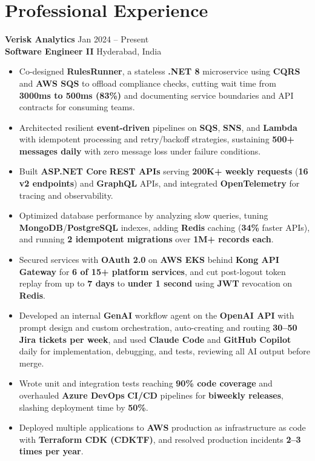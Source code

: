 \documentclass[a4paper,10pt]{article}
\begin{document}
\section*{Professional Experience}

\textbf{Verisk Analytics} \hfill Jan 2024 -- Present \\
\textbf{Software Engineer II} \hfill Hyderabad, India

\begin{itemize}[leftmargin=*]
    \item Co-designed \textbf{RulesRunner}, a stateless \textbf{.NET 8} microservice using \textbf{CQRS} and \textbf{AWS SQS} to offload compliance checks, cutting wait time from \textbf{3000ms to 500ms (83\%)} and documenting service boundaries and API contracts for consuming teams.
    \item Architected resilient \textbf{event-driven} pipelines on \textbf{SQS}, \textbf{SNS}, and \textbf{Lambda} with idempotent processing and retry/backoff strategies, sustaining \textbf{500+ messages daily} with zero message loss under failure conditions.
    \item Built \textbf{ASP.NET Core} \textbf{REST APIs} serving \textbf{200K+ weekly requests} (\textbf{16 v2 endpoints}) and \textbf{GraphQL} APIs, and integrated \textbf{OpenTelemetry} for tracing and observability.
    \item Optimized database performance by analyzing slow queries, tuning \textbf{MongoDB}/\textbf{PostgreSQL} indexes, adding \textbf{Redis} caching (\textbf{34\%} faster APIs), and running \textbf{2 idempotent migrations} over \textbf{1M+ records each}.
    \item Secured services with \textbf{OAuth 2.0} on \textbf{AWS EKS} behind \textbf{Kong API Gateway} for \textbf{6 of 15+ platform services}, and cut post-logout token replay from up to \textbf{7 days} to \textbf{under 1 second} using \textbf{JWT} revocation on \textbf{Redis}.
    \item Developed an internal \textbf{GenAI} workflow agent on the \textbf{OpenAI API} with prompt design and custom orchestration, auto-creating and routing \textbf{30--50 Jira tickets per week}, and used \textbf{Claude Code} and \textbf{GitHub Copilot} daily for implementation, debugging, and tests, reviewing all AI output before merge.
    \item Wrote unit and integration tests reaching \textbf{90\% code coverage} and overhauled \textbf{Azure DevOps} \textbf{CI/CD} pipelines for \textbf{biweekly releases}, slashing deployment time by \textbf{50\%}.
    \item Deployed multiple applications to \textbf{AWS} production as infrastructure as code with \textbf{Terraform CDK (CDKTF)}, and resolved production incidents \textbf{2--3 times per year}.
\end{itemize}
\end{document}
